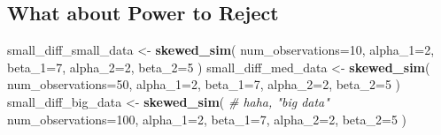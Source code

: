 \documentclass[
]{book}
\newenvironment{Shaded}{\begin{snugshade}}{\end{snugshade}}
\newcommand{\AttributeTok}[1]{\textcolor[rgb]{0.13,0.29,0.53}{#1}}
\newcommand{\CommentTok}[1]{\textcolor[rgb]{0.56,0.35,0.01}{\textit{#1}}}
\newcommand{\DecValTok}[1]{\textcolor[rgb]{0.00,0.00,0.81}{#1}}
\newcommand{\FunctionTok}[1]{\textcolor[rgb]{0.13,0.29,0.53}{\textbf{#1}}}
\newcommand{\NormalTok}[1]{#1}
\newcommand{\OtherTok}[1]{\textcolor[rgb]{0.56,0.35,0.01}{#1}}
\theoremstyle{definition}
\theoremstyle{definition}
\theoremstyle{definition}
\theoremstyle{definition}
\theoremstyle{remark}
\begin{document}
\subsection{What about Power to Reject}\label{what-about-power-to-reject}

\begin{Shaded}
\begin{Highlighting}[]
\NormalTok{small\_diff\_small\_data }\OtherTok{\textless{}{-}} \FunctionTok{skewed\_sim}\NormalTok{(}
  \AttributeTok{num\_observations=}\DecValTok{10}\NormalTok{, }
  \AttributeTok{alpha\_1=}\DecValTok{2}\NormalTok{, }\AttributeTok{beta\_1=}\DecValTok{7}\NormalTok{, }
  \AttributeTok{alpha\_2=}\DecValTok{2}\NormalTok{, }\AttributeTok{beta\_2=}\DecValTok{5}
\NormalTok{  )}
\NormalTok{small\_diff\_med\_data }\OtherTok{\textless{}{-}} \FunctionTok{skewed\_sim}\NormalTok{(}
  \AttributeTok{num\_observations=}\DecValTok{50}\NormalTok{, }
  \AttributeTok{alpha\_1=}\DecValTok{2}\NormalTok{, }\AttributeTok{beta\_1=}\DecValTok{7}\NormalTok{, }
  \AttributeTok{alpha\_2=}\DecValTok{2}\NormalTok{, }\AttributeTok{beta\_2=}\DecValTok{5}
\NormalTok{  )}
\NormalTok{small\_diff\_big\_data }\OtherTok{\textless{}{-}} \FunctionTok{skewed\_sim}\NormalTok{( }\CommentTok{\# haha, "big data"}
  \AttributeTok{num\_observations=}\DecValTok{100}\NormalTok{, }
  \AttributeTok{alpha\_1=}\DecValTok{2}\NormalTok{, }\AttributeTok{beta\_1=}\DecValTok{7}\NormalTok{, }
  \AttributeTok{alpha\_2=}\DecValTok{2}\NormalTok{, }\AttributeTok{beta\_2=}\DecValTok{5}
\NormalTok{  )}
\end{Highlighting}
\end{Shaded}
\end{document}
